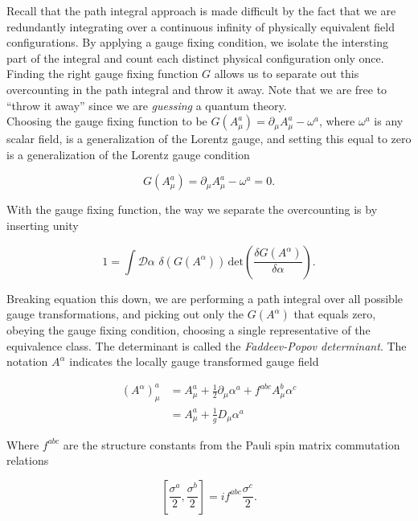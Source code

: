 \noindent Recall that the path integral approach is made difficult by the fact that we are redundantly integrating over a continuous infinity of physically equivalent field configurations. By applying a gauge fixing condition, we isolate the intersting part of the integral and count each distinct physical configuration only once. Finding the right gauge fixing function $G$ allows us to separate out this overcounting in the path integral and throw it away. Note that we are free to ``throw it away'' since we are \textit{guessing} a quantum theory.\\

\noindent Choosing the gauge fixing function to be $G(A_\mu^a) = \partial_\mu A_\mu^a - \omega^a$, where $\omega^a$ is any scalar field, is a generalization of the Lorentz gauge, and setting this equal to zero is a generalization of the Lorentz gauge condition

\begin{equation}
G(A_\mu^a) = \partial_\mu A_\mu^a - \omega^a = 0.
\end{equation}

\noindent With the gauge fixing function, the way we separate the overcounting is by inserting unity

\begin{equation}
1 = \int \mathcal{D} \alpha \,\, \delta(G(A^\alpha)) \, \text{det} \left( \frac{\delta G(A^\alpha)}{\delta \alpha} \right).
\end{equation}

\noindent Breaking equation this down, we are performing a path integral over all possible gauge transformations, and picking out only the $G(A^\alpha)$ that equals zero, obeying the gauge fixing condition, choosing a single representative of the equivalence class. The determinant is called the \textit{Faddeev-Popov determinant}. The notation $A^\alpha$ indicates the locally gauge transformed gauge field

\begin{align}
(A^\alpha)^a_\mu &= A^a_\mu + \frac{1}{2} \partial_\mu \alpha^a + f^{abc} A_\mu^b \alpha^c \\
&= A_\mu^a + \frac{1}{g} D_\mu \alpha^a
\end{align}

\noindent Where $f^{abc}$ are the structure constants from the Pauli spin matrix commutation relations

\begin{equation}
\left[ \frac{\sigma^a}{2}, \frac{\sigma^b}{2} \right] = i f^{abc} \frac{\sigma^c}{2}.
\end{equation}


